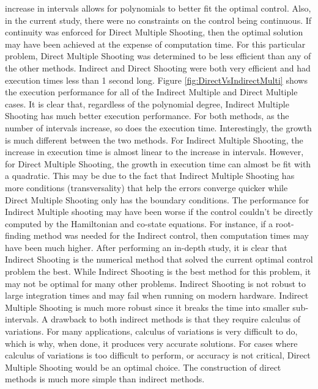 \documentclass[]{article}
\begin{document}
increase in intervals allows for polynomials to better fit the optimal control. Also, in the current study, there were no constraints on the control being continuous. If continuity was enforced for Direct Multiple Shooting, then the optimal solution may have been achieved at the expense of computation time. For this particular problem, Direct Multiple Shooting was determined to be less efficient than any of the other methods. Indirect and Direct Shooting were both very efficient and had execution times less than 1 second long. Figure \ref{fig:DirectVsIndirectMulti} shows the execution performance for all of the Indirect Multiple and Direct Multiple cases. It is clear that, regardless of the polynomial degree, Indirect Multiple Shooting has much better execution performance. For both methods, as the number of intervals increase, so does the execution time. Interestingly, the growth is much different between the two methods. For Indirect Multiple Shooting, the increase in execution time is almost linear to the increase in intervals. However, for Direct Multiple Shooting, the growth in execution time can almost be fit with a quadratic. This may be due to the fact that Indirect Multiple Shooting has more conditions (transversality) that help the errors converge quicker while Direct Multiple Shooting only has the boundary conditions. The performance for Indirect Multiple shooting may have been worse if the control couldn't be directly computed by the Hamiltonian and co-state equations. For instance, if a root-finding method was needed for the Indirect control, then computation times may have been much higher. 
\vspace{2mm}\newline 
After performing an in-depth study, it is clear that Indirect Shooting is the numerical method that solved the current optimal control problem the best. While Indirect Shooting is the best method for this problem, it may not be optimal for many other problems. Indirect Shooting is not robust to large integration times and may fail when running on modern hardware. Indirect Multiple Shooting is much more robust since it breaks the time into smaller sub-intervals. A drawback to both indirect methods is that they require calculus of variations. For many applications, calculus of variations is very difficult to do, which is why, when done, it produces very accurate solutions. For cases where calculus of variations is too difficult to perform, or accuracy is not critical, Direct Multiple Shooting would be an optimal choice. The construction of direct methods is much more simple than indirect methods.
\end{document}

